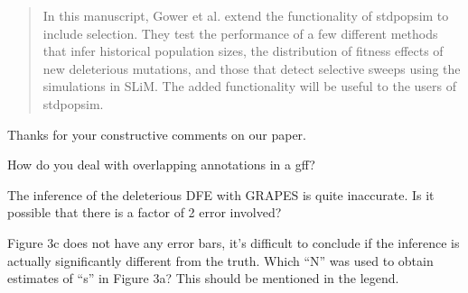   
  \begin{quote}
    \color{gray}
    In this manuscript, Gower et al. extend the functionality of stdpopsim to include selection. 
    They test the performance of a few different methods that infer historical population sizes, 
    the distribution of fitness effects of new deleterious mutations, and those that detect selective sweeps using the simulations in SLiM. 
    The added functionality will be useful to the users of stdpopsim.
\end{quote}
  
  Thanks for your constructive comments on our paper.
  
  \begin{point}{\revref} %
    How do you deal with overlapping annotations in a gff?
  \end{point}
  
  
  \begin{point}{}
    The inference of the deleterious DFE with GRAPES is quite inaccurate. 
    Is it possible that there is a factor of 2 error involved?
  \end{point}
  
  
  \begin{point}{\revref} %
    Figure 3c does not have any error bars, it’s difficult to conclude if the inference is actually significantly different from the truth. 
    Which “N” was used to obtain estimates of “s” in Figure 3a? 
    This should be mentioned in the legend.  \end{point}
  
